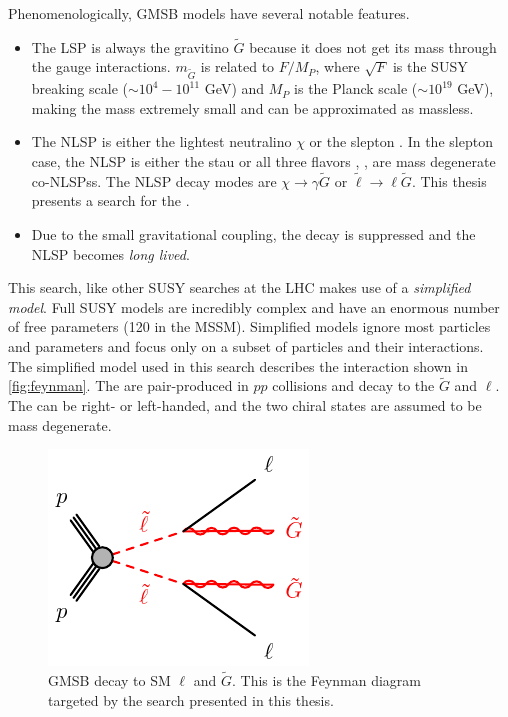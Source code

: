 Phenomenologically, \ac{GMSB} models have several notable features. 
\begin{itemize}
	\item The \ac{LSP} is always the gravitino $\tilde{G}$ because it does not get its mass through the gauge interactions. $m_{\tilde{G}}$ is related to $F/M_P$, where $\sqrt{F}$ is the \ac{SUSY} breaking scale ($\sim 10^4 - 10^{11}$ GeV) and $M_P$ is the Planck scale ($\sim 10^{19}$ GeV), making the mass extremely small and can be approximated as massless.

	\item The \ac{NLSP} is either the lightest neutralino $\chi$ or the slepton \slep. In the slepton case, the \ac{NLSP} is either the stau \stau or all three flavors \selec, \smu, \stau are mass degenerate co-\acp{NLSP}s. The \ac{NLSP} decay modes are $\chi \rightarrow \gamma \tilde{G}$ or $\tilde{\ell} \rightarrow \ell \tilde{G}$. This thesis presents a search for the  \slep. 

	\item Due to the small gravitational coupling, the decay is suppressed and the \ac{NLSP} becomes \emph{long lived}. 
\end{itemize}

This search, like other \ac{SUSY} searches at the \ac{LHC} makes use of a \emph{simplified model}.
Full \ac{SUSY} models are incredibly complex and have an enormous number of free parameters (120 in the \ac{MSSM}). Simplified models ignore most particles and parameters and focus only on a subset of particles and their interactions. The simplified model used in this search describes the interaction shown in \autoref{fig:feynman}. The \slep are pair-produced in $pp$ collisions and decay to the $\tilde{G}$ and $\ell$. The \slep can be right- or left-handed, and the two chiral states are assumed to be mass degenerate.

\begin{figure}[!h]
\centering
\includegraphics[width=.4\textwidth]{figures/theory/slsl-llGG-GMSB.pdf}
\caption{\ac{GMSB} \slep decay to \ac{SM} $\ell$ and $\tilde{G}$. This is the Feynman diagram targeted by the search presented in this thesis.}
\label{fig:feynman}
\end{figure}


